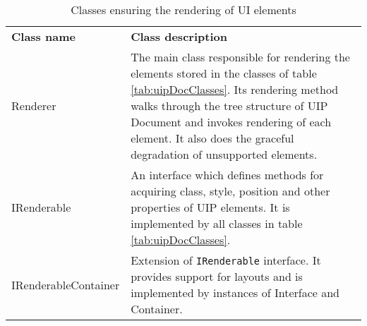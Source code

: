 \begin{table}[htbp]
  \centering
  \caption{Classes ensuring the rendering of UI elements}
  \label{tab:uipRenderClasses}
 \renewcommand{\arraystretch}{1.2}
    \begin{tabularx}{\textwidth}{p{3cm}|X}
    \rowcolor{mygray}
    \textbf{Class name} & \textbf{Class description} \\
       Renderer & The main class responsible for rendering the elements stored in the classes of table \ref{tab:uipDocClasses}. Its rendering method walks through the tree structure of UIP Document and invokes rendering of each element. It also does the graceful degradation of unsupported elements. \\ \hline
       IRenderable & An interface which defines methods for acquiring class, style, position and other properties of UIP elements. It is implemented by all classes in table \ref{tab:uipDocClasses}. \\ \hline
       \hspace{0pt}IRenderableContainer & Extension of \texttt{IRenderable} interface. It provides support for layouts and is implemented by instances of Interface and Container. \\
    \end{tabularx}%
\end{table}%